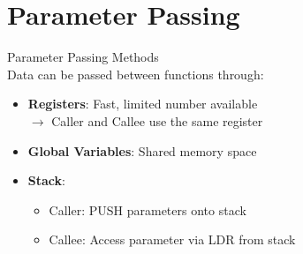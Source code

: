 \section{Parameter Passing}

\begin{definition}{Parameter Passing Methods}\\
Data can be passed between functions through:
\begin{itemize}
  \item \textbf{Registers}: Fast, limited number available \\ $\rightarrow$ Caller and Callee use the same register
  \item \textbf{Global Variables}: Shared memory space
  \item \textbf{Stack}: 
    \begin{itemize}
      \item Caller: PUSH parameters onto stack
      \item Callee: Access parameter via LDR from stack
    \end{itemize}
\end{itemize}
\end{definition}

